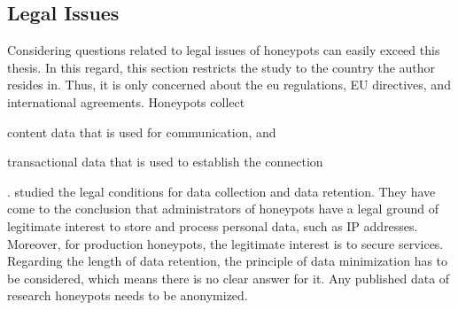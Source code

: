 \subsection{Legal Issues}

Considering questions related to legal issues of honeypots can easily exceed this thesis.
In this regard, this section restricts the study to the country the author resides in.
Thus, it is only concerned about the \ac{eu} regulations, EU directives, and international agreements.
Honeypots collect
\begin{enumerate*}[label=(\roman*)]
    \item content data that is used for communication, and
    \item transactional data that is used to establish the connection
\end{enumerate*}.
\citet{sokol2017} studied the legal conditions for data collection and data retention.
They have come to the conclusion that administrators of honeypots have a legal ground of legitimate interest to store and process personal data, such as IP addresses.
Moreover, for production honeypots, the legitimate interest is to secure services.
Regarding the length of data retention, the principle of data minimization has to be considered, which means there is no clear answer for it.
Any published data of research honeypots needs to be anonymized.

